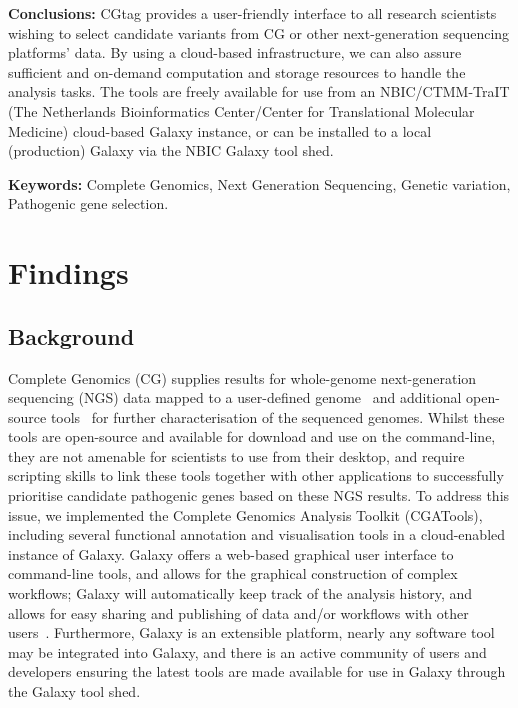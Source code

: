 \textbf{Conclusions:} CGtag provides a user-friendly interface to all research scientists wishing to select candidate variants from CG or other next-generation sequencing platforms’ data. By using a cloud-based infrastructure, we can also assure sufficient and on-demand computation and storage resources to handle the analysis tasks. The tools are freely available for use from an NBIC/CTMM-TraIT (The Netherlands Bioinformatics Center/Center for Translational Molecular Medicine) cloud-based Galaxy instance, or can be installed to a local (production) Galaxy via the NBIC Galaxy tool shed.

\textbf{Keywords:} Complete Genomics, Next Generation Sequencing, Genetic variation, Pathogenic gene selection.



\section*{Findings }

\subsection*{Background}

Complete Genomics (CG) supplies results for whole-genome next-generation sequencing (NGS) data mapped to a user-defined genome~\cite{ma} and additional open-source tools~\cite{url-cgatools} for further characterisation of the sequenced genomes. Whilst these tools are open-source and available for download and use on the command-line, they are not amenable for scientists to use from their desktop, and require scripting skills to link these tools together with other applications to successfully prioritise candidate pathogenic genes based on these NGS results. To address this issue, we implemented the Complete Genomics Analysis Toolkit (CGATools), including several functional annotation and visualisation tools in a cloud-enabled instance of Galaxy. Galaxy offers a web-based graphical user interface to command-line tools, and allows for the graphical construction of complex workflows; Galaxy will automatically keep track of the analysis history, and allows for easy sharing and publishing of data and/or workflows with other users~\cite{goecks2010galaxy, blankenberg2010galaxy2, giardine2005galaxy}. Furthermore, Galaxy is an extensible platform, nearly any software tool may be integrated into Galaxy, and there is an active community of users and developers ensuring the latest tools are made available for use in Galaxy through the Galaxy tool shed.

